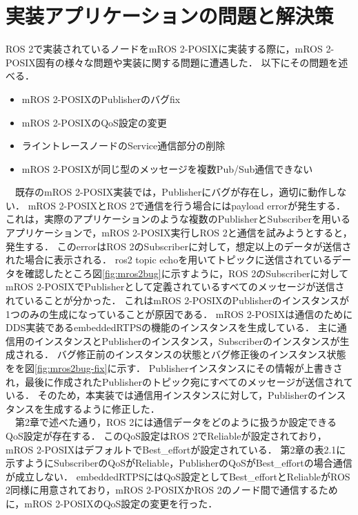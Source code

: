 \section{実装アプリケーションの問題と解決策}
ROS 2で実装されているノードをmROS 2-POSIXに実装する際に，mROS 2-POSIX固有の様々な問題や実装に関する問題に遭遇した．
以下にその問題を述べる．
\begin{itemize}
    \item mROS 2-POSIXのPublisherのバグfix
    \item mROS 2-POSIXのQoS設定の変更
    \item ライントレースノードのService通信部分の削除
    \item mROS 2-POSIXが同じ型のメッセージを複数Pub/Sub通信できない
\end{itemize}
　既存のmROS 2-POSIX実装では，Publisherにバグが存在し，適切に動作しない．
mROS 2-POSIXとROS 2で通信を行う場合にはpayload errorが発生する．
これは，実際のアプリケーションのような複数のPublisherとSubscriberを用いるアプリケーションで，mROS 2-POSIX実行しROS 2と通信を試みようとすると，発生する．
このerrorはROS 2のSubscriberに対して，想定以上のデータが送信された場合に表示される．
ros2 topic echoを用いてトピックに送信されているデータを確認したところ図\ref{fig:mros2bug}に示すように，ROS 2のSubscriberに対してmROS 2-POSIXでPublisherとして定義されているすべてのメッセージが送信されていることが分かった．
これはmROS 2-POSIXのPublisherのインスタンスが1つのみの生成になっていることが原因である．
mROS 2-POSIXは通信のためにDDS実装であるembeddedRTPSの機能のインスタンスを生成している．
主に通信用のインスタンスとPublisherのインスタンス，Subscriberのインスタンスが生成される．
バグ修正前のインスタンスの状態とバグ修正後のインスタンス状態をを図\ref{fig:mros2bug-fix}に示す．
Publisherインスタンスにその情報が上書きされ，最後に作成されたPublisherのトピック宛にすべてのメッセージが送信されている．
そのため，本実装では通信用インスタンスに対して，Publisherのインスタンスを生成するように修正した．
\\　第2章で述べた通り，ROS 2には通信データをどのように扱うか設定できるQoS設定が存在する．
このQoS設定はROS 2でReliableが設定されており，mROS 2-POSIXはデフォルトでBest\_effortが設定されている．
第2章の表2.1に示すようにSubscriberのQoSがReliable，PublisherのQoSがBest\_effortの場合通信が成立しない．
embeddedRTPSにはQoS設定としてBest\_effortとReliableがROS 2同様に用意されており，mROS 2-POSIXかROS 2のノード間で通信するために，mROS 2-POSIXのQoS設定の変更を行った．
